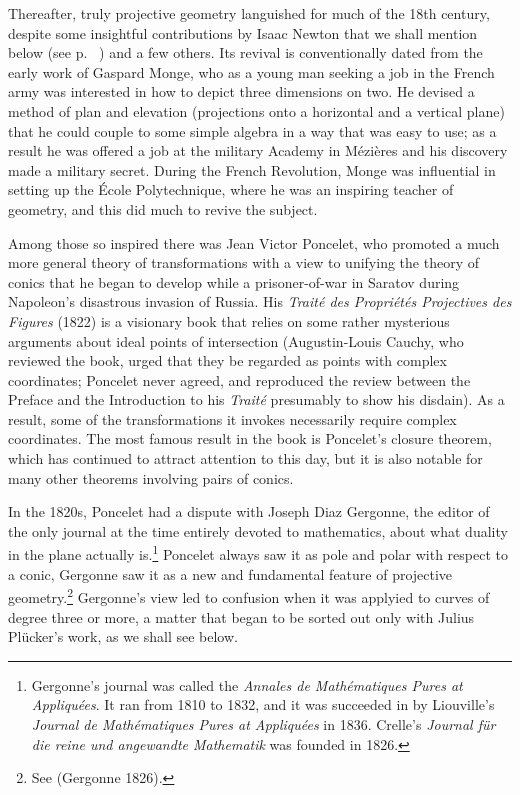 Thereafter, truly projective geometry languished for much of the 18th century, despite some insightful contributions by Isaac Newton that we shall mention below (see p. ~\pageref{Newtonconics}) and a few others. Its revival is conventionally dated from the early work of Gaspard Monge, who as a young man seeking a job in the French army was  interested in how to depict three dimensions on two. He devised a method of plan and elevation (projections onto a horizontal and a vertical plane) that he could couple to some simple algebra in a way that was easy to use; as a result he was offered a job at the military Academy in M\'ezi\`eres and his discovery made a military secret. During the French Revolution, Monge was influential in setting up the \'Ecole Polytechnique, where he was an inspiring teacher of geometry, and this did much to revive the subject. 

Among those so inspired there was Jean Victor Poncelet, who promoted a much more general theory of transformations with a view to unifying the theory of conics that he began to develop while a prisoner-of-war in Saratov during Napoleon's disastrous invasion of Russia. His \emph{Trait\'e des Propri\'et\'es Projectives des Figures} (1822) is a visionary book that relies on some rather mysterious arguments about ideal points of intersection (Augustin-Louis Cauchy, who reviewed the book, urged that they be regarded as points with complex coordinates; Poncelet never agreed, and reproduced the review between the Preface and the Introduction to his \emph{Trait\'e}  presumably to show his disdain). As a result, some of the transformations it invokes necessarily require complex coordinates. The most famous result in the book is Poncelet's closure theorem, which has continued to attract attention to this day, but it is also notable for many other theorems involving pairs of conics.


In the 1820s, Poncelet had a dispute with Joseph Diaz Gergonne, the editor of the only journal at the time entirely devoted to mathematics, about what duality in the plane actually is.\footnote{Gergonne's journal was called the \emph{Annales de Math\'ematiques Pures at Appliqu\'ees}. It ran from 1810 to 1832, and  it was succeeded in by Liouville's \emph{Journal de Math\'ematiques Pures at Appliqu\'ees} in 1836. Crelle's \emph{Journal f\"ur die reine und angewandte Mathematik} was founded in 1826.}
Poncelet always saw it as pole and polar with respect to a conic, Gergonne saw it as a new and fundamental feature of projective geometry.\footnote{See (Gergonne 1826).} Gergonne's view led to confusion when it was applyied to curves of degree three or more, a matter that began to be sorted out only with Julius Pl\"ucker's work, as we shall see below.


